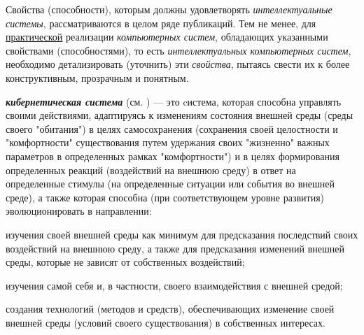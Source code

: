 Свойства (способности), которым должны удовлетворять \textit{интеллектуальные системы}, рассматриваются в целом ряде публикаций. 
Тем не менее, для \uline{практической} реализации \textit{компьютерных систем}, обладающих указанными свойствами (способностями), то есть \textit{интеллектуальных компьютерных систем}, необходимо детализировать (уточнить) эти \textit{свойства}, пытаясь свести их к более конструктивным, прозрачным и понятным.

\textbf{\textit{кибернетическая система}} (см. ) --- это cистема, которая способна управлять своими действиями, адаптируясь к изменениям состояния внешней среды (среды своего "обитания") в целях самосохранения (сохранения своей целостности и "комфортности"{} существования путем удержания своих "жизненно"{} важных параметров в определенных рамках "комфортности") и в целях формирования определенных реакций (воздействий на внешнюю среду) в ответ на определенные стимулы (на определенные ситуации или события во внешней среде), а также которая способна (при соответствующем уровне развития) эволюционировать в направлении:

\begin{textitemize}
    \item изучения своей внешней среды как минимум для предсказания последствий своих воздействий на внешнюю среду, а также для предсказания изменений внешней среды, которые не зависят от собственных воздействий;
    \item изучения самой себя и, в частности, своего взаимодействия с внешней средой;
    \item создания технологий (методов и средств), обеспечивающих изменение своей внешней среды (условий своего существования) в собственных интересах.
\end{textitemize}

